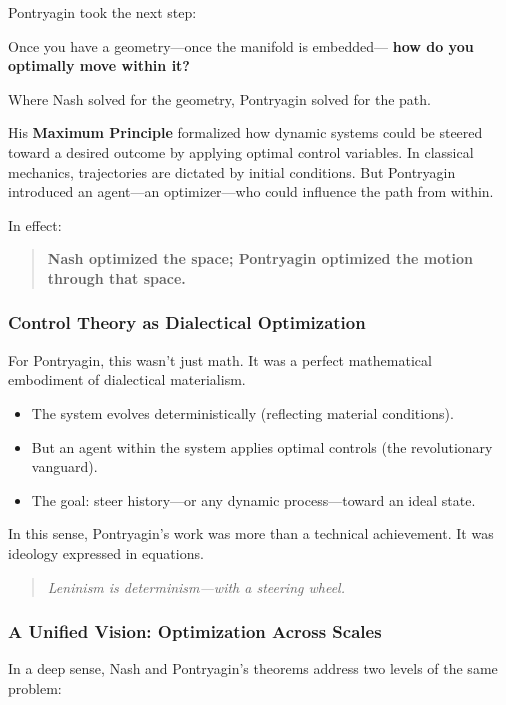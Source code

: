 Pontryagin took the next step:

Once you have a geometry—once the manifold is embedded—  
\textbf{how do you optimally move within it?}

Where Nash solved for the geometry,  
Pontryagin solved for the path.

\medskip

His \textbf{Maximum Principle} formalized how dynamic systems could be steered toward a desired outcome by applying optimal control variables. In classical mechanics, trajectories are dictated by initial conditions. But Pontryagin introduced an agent—an optimizer—who could influence the path from within.

In effect:

\begin{quote}
\textbf{Nash optimized the space; Pontryagin optimized the motion through that space.}
\end{quote}

\subsubsection*{Control Theory as Dialectical Optimization}

For Pontryagin, this wasn’t just math.  
It was a perfect mathematical embodiment of dialectical materialism.

\begin{itemize}
  \item The system evolves deterministically (reflecting material conditions).
  \item But an agent within the system applies optimal controls (the revolutionary vanguard).
  \item The goal: steer history—or any dynamic process—toward an ideal state.
\end{itemize}

In this sense, Pontryagin’s work was more than a technical achievement.  
It was ideology expressed in equations.

\begin{quote}
\textit{Leninism is determinism—with a steering wheel.}
\end{quote}

\subsubsection*{A Unified Vision: Optimization Across Scales}

In a deep sense, Nash and Pontryagin’s theorems address two levels of the same problem:

